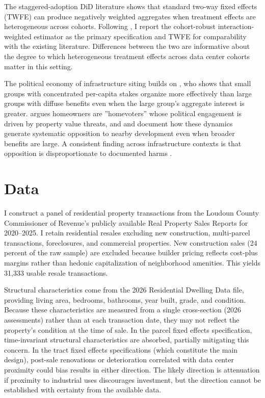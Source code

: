 \documentclass[12pt]{article}
\begin{document}
The staggered-adoption DiD literature \citep{GoodmanBacon2021, Roth2023} shows that standard two-way fixed effects (TWFE) can produce negatively weighted aggregates when treatment effects are heterogeneous across cohorts. Following \citet{Roth2023}, I report the \citet{SunAbraham2021} cohort-robust interaction-weighted estimator as the primary specification and TWFE for comparability with the existing literature. Differences between the two are informative about the degree to which heterogeneous treatment effects across data center cohorts matter in this setting.

The political economy of infrastructure siting builds on \citet{Olson1965}, who shows that small groups with concentrated per-capita stakes organize more effectively than large groups with diffuse benefits even when the large group's aggregate interest is greater. \citet{Fischel2001} argues homeowners are ''homevoters'' whose political engagement is driven by property value threats, and \citet{GlaeserGyourko2018} and \citet{MarbleNall2021} document how these dynamics generate systematic opposition to nearby development even when broader benefits are large. A consistent finding across infrastructure contexts is that opposition is disproportionate to documented harms \citep{Jarvis2025, Davis2011}.

\section{Data}
\label{sec:data}

I construct a panel of residential property transactions from the Loudoun County Commissioner of Revenue's publicly available Real Property Sales Reports for 2020--2025. I retain residential resales excluding new construction, multi-parcel transactions, foreclosures, and commercial properties. New construction sales (24 percent of the raw sample) are excluded because builder pricing reflects cost-plus margins rather than hedonic capitalization of neighborhood amenities. This yields 31,333 usable resale transactions.

Structural characteristics come from the 2026 Residential Dwelling Data file, providing living area, bedrooms, bathrooms, year built, grade, and condition. Because these characteristics are measured from a single cross-section (2026 assessments) rather than at each transaction date, they may not reflect the property's condition at the time of sale. In the parcel fixed effects specification, time-invariant structural characteristics are absorbed, partially mitigating this concern. In the tract fixed effects specifications (which constitute the main design), post-sale renovations or deterioration correlated with data center proximity could bias results in either direction. The likely direction is attenuation if proximity to industrial uses discourages investment, but the direction cannot be established with certainty from the available data.
\end{document}

